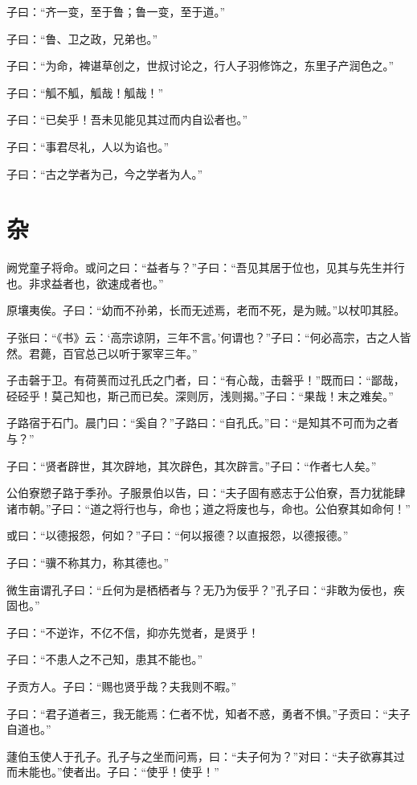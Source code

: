 \documentclass[a5paper]{ctexbook}
\begin{document}
    子曰：“齐一变，至于鲁；鲁一变，至于道。”

    子曰：“鲁、卫之政，兄弟也。”

    子曰：“为命，裨谌草创之，世叔讨论之，行人子羽修饰之，东里子产润色之。”

    子曰：“觚不觚，觚哉！觚哉！”

    子曰：“已矣乎！吾未见能见其过而内自讼者也。”

    子曰：“事君尽礼，人以为谄也。”

    子曰：“古之学者为己，今之学者为人。”

    \chapter{杂}

    阙党童子将命。或问之曰：“益者与？”子曰：“吾见其居于位也，见其与先生并行也。非求益者也，欲速成者也。”

    原壤夷俟。子曰：“幼而不孙弟，长而无述焉，老而不死，是为贼。”以杖叩其胫。

    子张曰：“《书》云：‘高宗谅阴，三年不言。’何谓也？”子曰：“何必高宗，古之人皆然。君薨，百官总己以听于冢宰三年。”

    子击磬于卫。有荷蒉而过孔氏之门者，曰：“有心哉，击磬乎！”既而曰：“鄙哉，硁硁乎！莫己知也，斯己而已矣。深则厉，浅则揭。”子曰：“果哉！末之难矣。”

    子路宿于石门。晨门曰：“奚自？”子路曰：“自孔氏。”曰：“是知其不可而为之者与？”

    子曰：“贤者辟世，其次辟地，其次辟色，其次辟言。”子曰：“作者七人矣。”

    公伯寮愬子路于季孙。子服景伯以告，曰：“夫子固有惑志于公伯寮，吾力犹能肆诸市朝。”子曰：“道之将行也与，命也；道之将废也与，命也。公伯寮其如命何！”

    或曰：“以德报怨，何如？”子曰：“何以报德？以直报怨，以德报德。”

    子曰：“骥不称其力，称其德也。”

    微生亩谓孔子曰：“丘何为是栖栖者与？无乃为佞乎？”孔子曰：“非敢为佞也，疾固也。”

    子曰：“不逆诈，不亿不信，抑亦先觉者，是贤乎！

    子曰：“不患人之不己知，患其不能也。”

    子贡方人。子曰：“赐也贤乎哉？夫我则不暇。”

    子曰：“君子道者三，我无能焉：仁者不忧，知者不惑，勇者不惧。”子贡曰：“夫子自道也。”

    蘧伯玉使人于孔子。孔子与之坐而问焉，曰：“夫子何为？”对曰：“夫子欲寡其过而未能也。”使者出。子曰：“使乎！使乎！”
\end{document}
